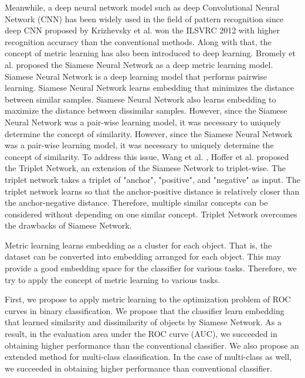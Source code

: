 \documentclass[a4paper,12pt]{article}
\begin{document}
Meanwhile, a deep neural network model such as deep Convolutional Neural Network (CNN) has been widely used in the field of pattern recognition since deep CNN proposed by Krizhevsky et al. \cite{Krizhevsky2012} won the ILSVRC 2012 with higher recognition accuracy than the conventional methods.
Along with that, the concept of metric learning has also been introduced to deep learning.
Bromely et al. \cite{Bromely1994,Chopra2005,Hadsell2006} proposed the Siamese Neural Network as a deep metric learning model.
Siamese Neural Network is a deep learning model that performs pairwise learning.
Siamese Neural Network learns embedding that minimizes the distance between similar samples.
Siamese Neural Network also learns embedding to maximize the distance between dissimilar samples.
However, since the Siamese Neural Network was a pair-wise learning model, it was necessary to uniquely determine the concept of similarity.
However, since the Siamese Neural Network was a pair-wise learning model, it was necessary to uniquely determine the concept of similarity.
To address this issue, Wang et al. \cite{Wang2014}, Hoffer et al. \cite{Hoffer2015} proposed the Triplet Network, an extension of the Siamese Network to triplet-wise.
The triplet network takes a triplet of "anchor", "positive", and "negative" as input.
The triplet network learns so that the anchor-positive distance is relatively closer than the anchor-negative distance.
Therefore, multiple similar concepts can be considered without depending on one similar concept.
Triplet Network overcomes the drawbacks of Siamese Network.

Metric learning learns embedding as a cluster for each object.
That is, the dataset can be converted into embedding arranged for each object.
This may provide a good embedding space for the classifier for various tasks.
Therefore, we try to apply the concept of metric learning to various tasks.

First, we propose to apply metric learning to the optimization problem of ROC curves in binary classification.
We propose that the classifier learn embedding that learned similarity and dissimilarity of objects by Siamese Network.
As a result, in the evaluation area under the ROC curve (AUC), we succeeded in obtaining higher performance than the conventional classifier.
We also propose an extended method for multi-class classification.
In the case of multi-class as well, we succeeded in obtaining higher performance than conventional classifier.
\end{document}
